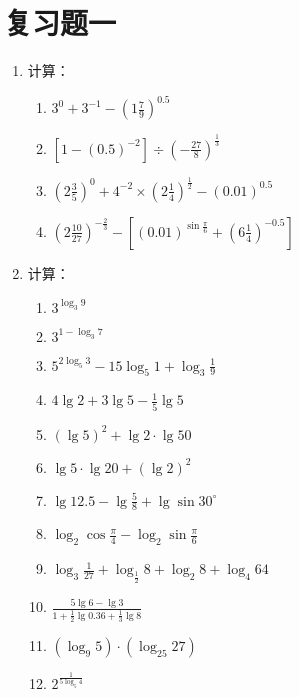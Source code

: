 \section*{复习题一}
\begin{enumerate}
    \item 计算：
\begin{enumerate}
\item    $3^{0}+3^{-1}-\left(1\frac{7}{9}\right)^{0.5}$
\item   $\left[1-(0.5)^{-2}\right] \div\left(-\frac{27}{8}\right)^{\tfrac{1}{3}}$
\item    $\left(2 \frac{3}{5}\right)^{0}+4^{-2} \times\left(2 \frac{1}{4}\right)^{\tfrac{1}{2}}-(0.01)^{0.5}$
\item   $\left(2 \frac{10}{27}\right)^{-\tfrac{2}{3}}-\left[(0.01)^{\sin\tfrac{\pi}{6}}+\left(6 \frac{1}{4}\right)^{-0.5}\right]$
\end{enumerate}
\item 计算：
\begin{enumerate}
    \item $3^{\log_{3} 9}$
    \item $3^{1-\log _{3} 7}$
    \item $5^{2 \log _{5} 3}-15 \log _{5} 1+\log _{3} \frac{1}{9}$
    \item $4\lg 2+3 \lg 5-\frac{1}{5} \lg 5$
    \item $(\lg 5)^{2}+\lg 2 \cdot \lg 50$
    \item $\lg 5 \cdot \lg 20+(\lg 2)^{2}$
    \item $\lg 12.5-\lg  \frac{5}{8}+\lg\sin 30^{\circ}$
    \item $\log _{2} \cos \frac{\pi}{4}-\log _{2} \sin \frac{\pi}{6}$
    \item $\log _{3} \frac{1}{27}+\log _{\tfrac{1}{2}} 8+\log _{2} 8+\log _{4} 64$
    \item $\frac{5 \lg 6-\lg 3}{1+\frac{1}{2} \lg 0.36+\frac{1}{3} \lg 8}$
    \item $\left(\log _{9} 5\right) \cdot\left(\log _{25} 27\right)$
    \item $2^{\tfrac{1}{5 \log _{5}4}}$
\end{enumerate}


\end{enumerate}
